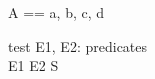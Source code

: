 \documentclass{llncs}
\begin{document}
\begin{zed}
A == \langle a, b, c, d  \rangle
\end{zed}
\begin{schema}{test}
E1, E2: predicates\\
\where E1 \land E2  \in S
\end{schema}
\end{document}
